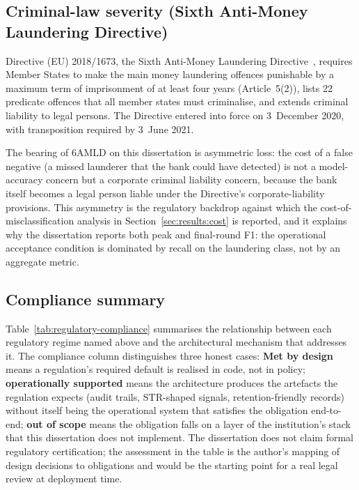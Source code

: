 \documentclass{report}
\begin{document}
\subsection{Criminal-law severity (Sixth Anti-Money Laundering Directive)}

Directive (EU) 2018/1673, the Sixth Anti-Money Laundering Directive~\cite{eu6amld2018}, requires Member States to make the main money laundering offences punishable by a maximum term of imprisonment of at least four years (Article~5(2)), lists 22 predicate offences that all member states must criminalise, and extends criminal liability to legal persons. The Directive entered into force on 3~December 2020, with transposition required by 3~June 2021.

The bearing of 6AMLD on this dissertation is asymmetric loss: the cost of a false negative (a missed launderer that the bank could have detected) is not a model-accuracy concern but a corporate criminal liability concern, because the bank itself becomes a legal person liable under the Directive's corporate-liability provisions. This asymmetry is the regulatory backdrop against which the cost-of-misclassification analysis in Section~\ref{sec:results:cost} is reported, and it explains why the dissertation reports both peak and final-round F1: the operational acceptance condition is dominated by recall on the laundering class, not by an aggregate metric.

\subsection{Compliance summary}
\label{sec:meth:regulatory:summary}

Table~\ref{tab:regulatory-compliance} summarises the relationship between each regulatory regime named above and the architectural mechanism that addresses it. The compliance column distinguishes three honest cases: \textbf{Met by design} means a regulation's required default is realised in code, not in policy; \textbf{operationally supported} means the architecture produces the artefacts the regulation expects (audit trails, STR-shaped signals, retention-friendly records) without itself being the operational system that satisfies the obligation end-to-end; \textbf{out of scope} means the obligation falls on a layer of the institution's stack that this dissertation does not implement. The dissertation does not claim formal regulatory certification; the assessment in the table is the author's mapping of design decisions to obligations and would be the starting point for a real legal review at deployment time.
\end{document}
